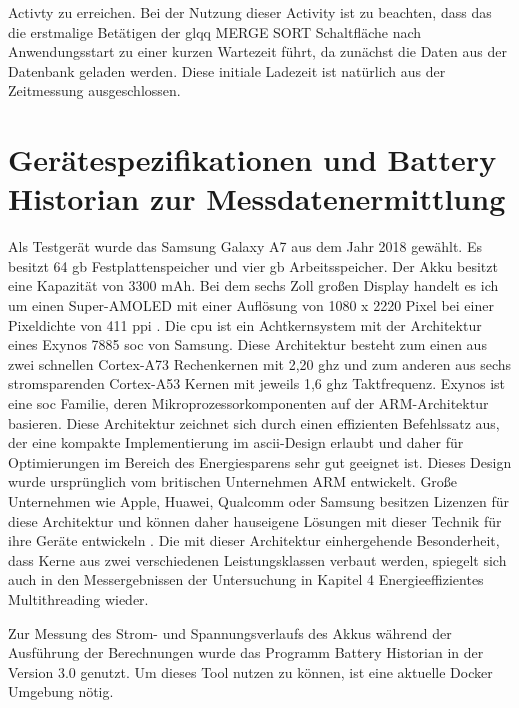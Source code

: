 Activty zu erreichen. Bei der Nutzung dieser Activity ist zu beachten, dass das die erstmalige Betätigen der glqq MERGE SORT\grqq{} Schaltfläche nach Anwendungsstart zu einer kurzen Wartezeit führt, da zunächst die Daten aus der Datenbank geladen werden. Diese initiale Ladezeit ist natürlich aus der Zeitmessung ausgeschlossen.

\section{Gerätespezifikationen und Battery Historian zur Messdatenermittlung}

Als Testgerät wurde das Samsung Galaxy A7 aus dem Jahr 2018 gewählt. Es besitzt 64 \ac{gb} Festplattenspeicher und vier \ac{gb} Arbeitsspeicher. Der Akku besitzt eine Kapazität von 3300 \ac{mAh}. Bei dem sechs Zoll großen Display handelt es ich um einen Super-AMOLED mit einer Auflösung von 1080 x 2220 Pixel bei einer Pixeldichte von 411 \ac{ppi} \cite{smartphone-data}. Die \ac{cpu} ist ein Achtkernsystem mit der Architektur eines Exynos 7885 \ac{soc} von Samsung.  Diese Architektur besteht zum einen aus zwei schnellen Cortex-A73 Rechenkernen mit 2,20 \ac{ghz} und zum anderen aus sechs stromsparenden Cortex-A53 Kernen mit jeweils 1,6 \ac{ghz} Taktfrequenz. Exynos ist eine \ac{soc} Familie, deren Mikroprozessorkomponenten auf der ARM-Architektur basieren. Diese Architektur zeichnet sich durch einen effizienten Befehlssatz aus, der eine kompakte Implementierung im \ac{ascii}-Design erlaubt und daher für Optimierungen im Bereich des Energiesparens sehr gut geeignet ist. Dieses Design wurde ursprünglich vom britischen Unternehmen ARM entwickelt. Große Unternehmen wie Apple, Huawei, Qualcomm oder Samsung besitzen Lizenzen für diese Architektur und können daher hauseigene Lösungen mit dieser Technik für ihre Geräte entwickeln \cite{cpu-data}. Die mit dieser Architektur einhergehende Besonderheit, dass Kerne aus zwei verschiedenen Leistungsklassen verbaut werden, spiegelt sich auch in den Messergebnissen der Untersuchung in Kapitel 4 \glqq Energieeffizientes Multithreading\grqq{} wieder.

Zur Messung des Strom- und Spannungsverlaufs des Akkus während der Ausführung der Berechnungen wurde das Programm Battery Historian in der Version 3.0 genutzt. Um dieses Tool nutzen zu können, ist eine aktuelle Docker Umgebung nötig. 

